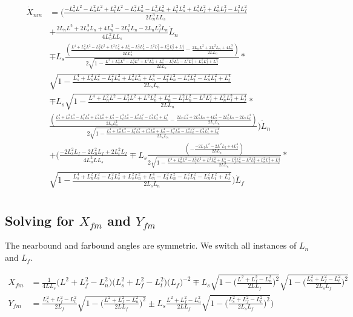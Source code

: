 \documentclass[11pt, landscape]{article}
\begin{document}
\begin{align}
  \dot{X}_{nm} &= \Bigg(\frac{-L_s^2L^2 - L_n^2L^2 + L_t^2L^2 - L_s^2L_{n}^2 - L_n^2L_{n}^2 + L_t^2L_{n}^2 + L_s^2L_{f}^2 + L_n^2L_{f}^2 - L_t^2L_{f}^2}{{2L_n^{3}LL_s}}\\
  &+ \frac{2L_nL^2 + 2L_s^2L_{n} + 4L_n^3 - 2L_t^2L_{n} - 2L_nL_{f}^2\dot{L}_n}{4L_n^2LL_s}\dot{L}_n\\
  &\mp L_s\frac{\left(\frac{L^4 + L_n^2L^2 - L_f^2L^2 + L^2L_{n}^2 + L_{n}^4 - L_f^2L_{n}^2 - L^2L_{f}^2 + L_n^2L_{f}^2 + L_{f}^4}{2LL^2_{n}} - \frac{2L_nL^2 + 2L^2L_{n} + 4L_{n}^3}{2LL_{n}}\right)}{2\sqrt{1-\frac{L^4 + L_n^2L^2 - L_f^2L^2 + L^2L_{n}^2 + L_{n}^4 - L_f^2L_{n}^2 - L^2L_{f}^2 + L_n^2L_{f}^2 + L_{f}^4}{2LL_{n}}}}*\\
  &\sqrt{1-\frac{L_{s}^4 + L_n^2L_{s}^2 - L_t^2L_{s}^2 + L_s^2L_{n}^2 + L_{n}^4 - L_t^2L_{n}^2 - L_s^2L_{t}^2 - L_n^2L_{t}^2 + L_{t}^4}{2L_{s}L_{n}}}\\
  &\mp L_s\sqrt{1-\frac{L^4 + L_n^2L^2 - L_f^2L^2 + L^2L_{n}^2 + L_{n}^4 - L_f^2L_{n}^2 - L^2L_{f}^2 + L_n^2L_{f}^2 + L_{f}^4}{2LL_{n}}}*\\
  &\frac{\left(\frac{L_{s}^4 + L_n^2L_{s}^2 - L_t^2L_{s}^2 + L_s^2L_{n}^2 + L_{n}^4 - L_t^2L_{n}^2 - L_s^2L_{t}^2 - L_n^2L_{t}^2 + L_{t}^4}{2L_{s}L^2_{n}}
    - \frac{2L_nL_{s}^2 + 2L_s^2L_{n} + 4L_{n}^3 - 2L_t^2L_{n} - 2L_nL_{t}^2}{2L_{s}L_{n}}\right)}{2\sqrt{1-\frac{L_{s}^4 + L_n^2L_{s}^2 - L_t^2L_{s}^2 + L_s^2L_{n}^2 + L_{n}^4 - L_t^2L_{n}^2 - L_s^2L_{t}^2 - L_n^2L_{t}^2 + L_{t}^4}{2L_{s}L_{n}}}}\Bigg)\dot{L}_n\\
  &+ \Bigg(\frac{-2L_s^2L_{f} - 2L_n^2L_{f} + 2L_t^2L_{f}}{4L_n^2LL_s} \mp L_s\frac{\left(-\frac{-2L_fL^2 - 2L^2L_{f} + 4L_{f}^3}{2LL_{n}}\right)}{2\sqrt{1-\frac{L^4 + L_n^2L^2 - L_f^2L^2 + L^2L_{n}^2 + L_{n}^4 - L_f^2L_{n}^2 - L^2L_{f}^2 + L_n^2L_{f}^2 + L_{f}^4}{2LL_{n}}}}*\\
  &\sqrt{1-\frac{L_{s}^4 + L_n^2L_{s}^2 - L_t^2L_{s}^2 + L_s^2L_{n}^2 + L_{n}^4 - L_t^2L_{n}^2 - L_s^2L_{t}^2 - L_n^2L_{t}^2 + L_{t}^4}{2L_{s}L_{n}}}\Bigg)\dot{L}_f\\
\end{align}


\subsection{Solving for $X_{fm}$ and $Y_{fm}$}
The nearbound and farbound angles are symmetric. We switch all instances of $L_n$ and $L_f$.

\begin{align}
  X_{fm} &= \frac{1}{4LL_s}\Big(L^2+L_{f}^2-L_{n}^2\Big)\Big(L_{s}^2+L_{f}^2-L_{t}^2\Big)\big(L_f \big)^{-2} \mp L_s\sqrt{1-\bigg(\frac{L^2+L_{f}^2-L_{n}^2}{2LL_{f}}\bigg)^2}\sqrt{1-\bigg(\frac{L_{s}^2+L_{f}^2-L_{t}^2}{2L_{s}L_{f}}\bigg)^2}\\
  Y_{fm} &= \frac{L_{s}^2+L_{f}^2-L_{t}^2}{2L_{f}}\sqrt{1-\bigg(\frac{L^2+L_{f}^2-L_{n}^2}{2LL_{f}}\bigg)^2} \pm L_s\frac{L^2+L_{f}^2-L_{n}^2}{2LL_{f}}\sqrt{1-\bigg(\frac{L_{s}^2+L_{f}^2-L_{t}^2}{2L_{s}L_{f}}\bigg)^2} \Bigg)\\
\end{align}
\end{document}

